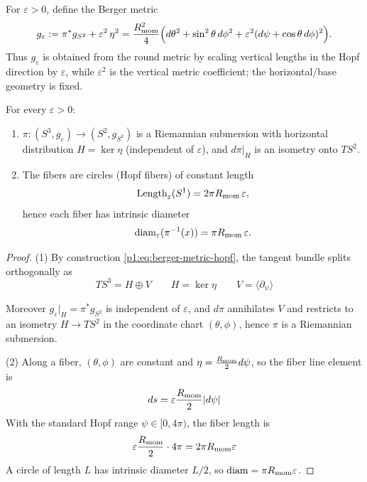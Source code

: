 \documentclass[11pt]{article}
\begin{document}
\begin{definition}\label{p1:def:berger-canonical-variation}
For $\varepsilon>0$, define the Berger metric
\begin{equation}\label{p1:eq:berger-metric-hopf}
g_{\varepsilon}:=\pi^*g_{S^2}+\varepsilon^2\,\eta^2
=\frac{R_{\mathrm{mom}}^2}{4}\Big(d\theta^2+\sin^2\theta\,d\phi^2+\varepsilon^2(d\psi+\cos\theta\,d\phi)^2\Big).
\end{equation}
Thus \(g_\varepsilon\) is obtained from the round metric by scaling vertical lengths in the Hopf direction by \(\varepsilon\), while \(\varepsilon^2\) is the vertical metric coefficient; the horizontal/base geometry is fixed.
\end{definition}

\begin{proposition}\label{p1:prop:submersion-fiber-length}
For every $\varepsilon>0$:
\begin{enumerate}
\item $\pi:(S^3,g_\varepsilon)\to(S^2,g_{S^2})$ is a Riemannian submersion with horizontal distribution
$H=\ker\eta$ (independent of $\varepsilon$), and $d\pi|_{H}$ is an isometry onto $TS^2$.
\item The fibers are circles (Hopf fibers) of constant length
\[
\mathrm{Length}_\varepsilon(S^1)=2\pi R_{\mathrm{mom}}\,\varepsilon,
\]
hence each fiber has intrinsic diameter
\[
\mathrm{diam}_\varepsilon(\pi^{-1}(x))=\pi R_{\mathrm{mom}}\,\varepsilon.
\]
\end{enumerate}
\end{proposition}

\begin{proof}
(1) By construction \eqref{p1:eq:berger-metric-hopf}, the tangent bundle splits orthogonally as
\[
TS^3=H\oplus V 
\qquad
H=\ker\eta 
\qquad
V=\langle \partial_\psi\rangle
\]

Moreover $g_\varepsilon|_{H}=\pi^*g_{S^2}$ is independent of $\varepsilon$, and $d\pi$ annihilates $V$ and
restricts to an isometry $H\to TS^2$ in the coordinate chart $(\theta,\phi)$, hence $\pi$ is a Riemannian
submersion.

(2) Along a fiber, $(\theta,\phi)$ are constant and $\eta=\frac{R_{\mathrm{mom}}}{2}d\psi$, so the fiber line element is
\[
ds=\varepsilon \frac{R_{\mathrm{mom}}}{2}|d\psi|
\]
With the standard Hopf range $\psi\in[0,4\pi)$, the fiber length is
\[
\varepsilon\frac{R_{\mathrm{mom}}}{2}\cdot 4\pi=2\pi R_{\mathrm{mom}}\varepsilon
\]
A circle of length $L$ has intrinsic diameter $L/2$,
so $\mathrm{diam}=\pi R_{\mathrm{mom}}\varepsilon$.
\end{proof}
\end{document}
